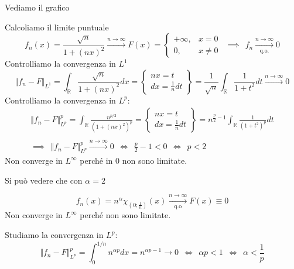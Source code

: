 Vediamo il grafico


Calcoliamo il limite puntuale
\begin{equation*}
f_{n} (x)=\frac{\sqrt{n}}{1+(nx)^{2}}\xrightarrow{n\rightarrow \infty } F(x)=\begin{cases}
+\infty , & x=0\\
0, & x\neq 0
\end{cases} \ \ \implies \ \ f_{n}\xrightarrow[\text{q.o.}]{n\rightarrow \infty } 0
\end{equation*}
Controlliamo la convergenza in $L^{1}$
\begin{equation*}
\Vert f_{n} -F\Vert _{L^{1}} =\int _{\mathbb{R}}\frac{\sqrt{n}}{1+(nx)^{2}} dx=\left\{\begin{array}{ c }
nx=t\\
dx=\frac{1}{n} dt
\end{array}\right\} =\frac{1}{\sqrt{n}}\int _{\mathbb{R}}\frac{1}{1+t^{2}} dt\xrightarrow{n\rightarrow \infty } 0
\end{equation*}
Controlliamo la convergenza in $L^{p}$:
\begin{gather*}
\Vert f_{n} -F\Vert ^{p}_{L^{p}} =\int _{\mathbb{R}}\frac{n^{p/2}}{(1+(nx)^{2} )^{p}} =\left\{\begin{array}{ c }
nx=t\\
dx=\frac{1}{n} dt
\end{array}\right\} =n^{\frac{p}{2} -1}\int _{\mathbb{R}}\frac{1}{(1+t^{2} )^{p}} dt\\
\\
\implies \ \ \Vert f_{n} -F\Vert ^{p}_{L^{p}}\xrightarrow{n\rightarrow \infty } 0\ \ \iff \ \ \frac{p}{2} -1< 0\ \ \iff \ \ p< 2
\end{gather*}
Non converge in $L^{\infty }$ perché in $0$ non sono limitate.
\Soluzione

Si può vedere che con $\alpha =2$

\begin{equation*}
f_{n} (x)=n^{\alpha } \chi _{\left( 0;\frac{1}{n}\right)} (x)\xrightarrow[\text{q.o}]{n\rightarrow \infty } F(x)\equiv 0
\end{equation*}
Non converge in $L^{\infty }$ perché non sono limitate.

Studiamo la convergenza in $L^{p}$:
\begin{equation*}
\Vert f_{n} -F\Vert ^{p}_{L^{p}} =\int ^{1/n}_{0} n^{\alpha p} dx=n^{\alpha p-1}\rightarrow 0\ \ \iff \ \ \alpha p< 1\ \ \iff \ \ \alpha < \frac{1}{p}
\end{equation*}
\Soluzione

